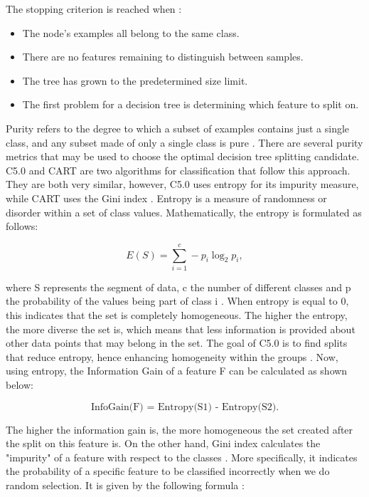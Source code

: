 \documentclass{usiinftr}
\begin{document}
The stopping criterion is reached when \cite{4}:
\begin{itemize}
\item The node's examples all belong to the same class.
\item There are no features remaining to distinguish between samples.
\item The tree has grown to the predetermined size limit. 
\item The first problem for a decision tree is determining which feature to split on.
\end{itemize}

Purity refers to the degree to which a subset of examples contains just a single class, and any subset made of only a single class is pure \cite{4}. There are several purity metrics that may be used to choose the optimal decision tree splitting candidate. C5.0 and CART are two algorithms for classification that follow this approach. They are both very similar, however, C5.0 uses entropy for its impurity measure, while CART uses the Gini index \cite{2}. Entropy is a measure of randomness or disorder within a set of class values. Mathematically, the entropy is formulated as follows: 

\begin{equation}
E(S)=\sum_{i=1}^{c}-p_{i} \log _{2} p_{i},
\end{equation}

where S represents the segment of data, c the number of different classes and p the probability of the values being part of class i \cite{4}. When entropy is equal to 0, this indicates that the set is completely homogeneous. The higher the entropy, the more diverse the set is, which means that less information is provided about other data points that may belong in the set. The goal of C5.0 is to find splits that reduce entropy,  hence enhancing homogeneity within the groups \cite{4}. Now, using entropy, the Information Gain of a feature F can be calculated as shown below\cite{4}:

\begin{equation}
\text{InfoGain(F) = Entropy(S1) - Entropy(S2).}
\end{equation}

The higher the information gain is, the more homogeneous the set created after the split on this feature is. On the other hand, Gini index calculates the "impurity" of a feature with respect to the classes \cite{5}. More specifically, it indicates the probability of a specific feature to be classified incorrectly when we do random selection. It is given by the following formula \cite{5}:
\end{document}
